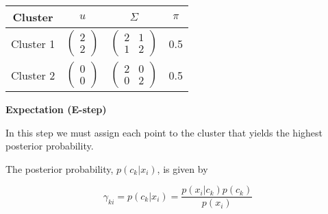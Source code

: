 \documentclass[12pt]{article}
\begin{document}
\begin{enumerate}[leftmargin=\labelsep]
          \begin{center}
              \captionsetup{type=table}
              \begin{tabular}{c|ccc}
                  Cluster                       & $u$ & $\varSigma$ & $\pi$ \\
                  \hline
                  \colorbox{bgreen}{Cluster 1}  &
                  $\begin{pmatrix}
                           2 \\
                           2
                       \end{pmatrix}$              &
                  $\begin{pmatrix}
                           2 & 1 \\
                           1 & 2
                       \end{pmatrix}$              &
                  0.5                                                       \\
                  \colorbox{byellow}{Cluster 2} &
                  $\begin{pmatrix}
                           0 \\
                           0
                       \end{pmatrix}$              &
                  $\begin{pmatrix}
                           2 & 0 \\
                           0 & 2
                       \end{pmatrix}$              &
                  0.5                                                       \\
              \end{tabular}
              \label{ex1-initial-params-table}
          \end{center}

          \textbf{Expectation (E-step)}

          In this step we must assign each point to the cluster that yields
          the highest posterior probability.

          The posterior probability, $p(c_k | x_i)$, is given by

          \begin{equation}\label{ex1-posterior}
              \gamma_{ki} = p(c_k | x_i) = \frac{p(x_i|c_k)p(c_k)}{p(x_i)}
          \end{equation}


\end{enumerate}
\end{document}
